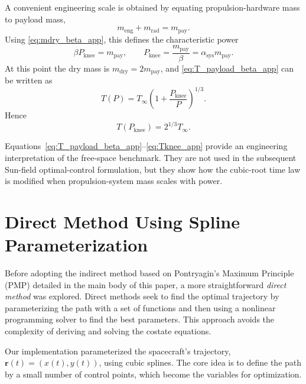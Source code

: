 \documentclass[journal, a4paper]{IEEEtran}
\begin{document}
A convenient engineering scale is obtained by equating propulsion-hardware mass to payload mass,
\begin{equation}
  m_\mathrm{eng}+m_\mathrm{rad}=m_\mathrm{pay}.
\end{equation}
Using \eqref{eq:mdry_beta_app}, this defines the characteristic power
\begin{equation}
  \beta P_\mathrm{knee}=m_\mathrm{pay},
  \qquad
  P_\mathrm{knee}=\frac{m_\mathrm{pay}}{\beta}
  = \alpha_\mathrm{sys}m_\mathrm{pay}.
  \label{eq:Pknee_app}
\end{equation}
At this point the dry mass is \(m_\mathrm{dry}=2m_\mathrm{pay}\), and \eqref{eq:T_payload_beta_app} can be written as
\begin{equation}
  T(P)=T_\infty
  \left(
    1+\frac{P_\mathrm{knee}}{P}
  \right)^{1/3}.
  \label{eq:T_knee_form_app}
\end{equation}
Hence
\begin{equation}
  T(P_\mathrm{knee}) = 2^{1/3}T_\infty.
  \label{eq:Tknee_app}
\end{equation}

Equations~\eqref{eq:T_payload_beta_app}--\eqref{eq:Tknee_app} provide an engineering interpretation of the free-space benchmark. 
They are not used in the subsequent Sun-field optimal-control formulation, but they show how the cubic-root time law is modified when propulsion-system mass scales with power.

\section{Direct Method Using Spline Parameterization}

\label{sec:appendix}
Before adopting the indirect method based on Pontryagin's Maximum Principle (PMP) detailed in the main body of this paper, a more straightforward \emph{direct method} was explored. Direct methods seek to find the optimal trajectory by parameterizing the path with a set of functions and then using a nonlinear programming solver to find the best parameters. This approach avoids the complexity of deriving and solving the costate equations.

Our implementation parameterized the spacecraft's trajectory, $\mathbf{r}(t) = (x(t), y(t))$, using cubic splines. The core idea is to define the path by a small number of control points, which become the variables for optimization.
\end{document}
